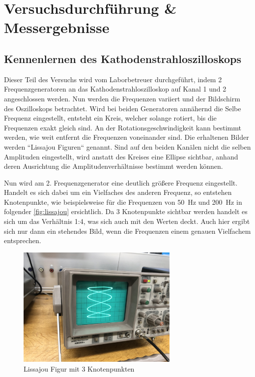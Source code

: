 \documentclass[11pt,ngerman]{scrartcl}
\begin{document}
\newpage

\section{Versuchsdurchführung \& Messergebnisse}\label{sec:Versuchsdurchführung}

\subsection{Kennenlernen des Kathodenstrahloszilloskops}

Dieser Teil des Versuchs wird vom Laborbetreuer durchgeführt, indem 2 Frequenzgeneratoren an das Kathodenstrahloszilloskop auf Kanal 1 und 2 angeschlossen werden. Nun werden die Frequenzen variiert und der Bildschirm des Oszilloskops betrachtet. Wird bei beiden Generatoren annähernd die Selbe Frequenz eingestellt, entsteht ein Kreis, welcher solange rotiert, bis die Frequenzen exakt gleich sind. An der Rotationsgeschwindigkeit kann bestimmt werden, wie weit entfernt die Frequenzen voneinander sind. Die erhaltenen Bilder werden ``Lissajou Figuren`` genannt.
Sind auf den beiden Kanälen nicht die selben Amplituden eingestellt, wird anstatt des Kreises eine Ellipse sichtbar, anhand deren Ausrichtung die Amplitudenverhältnisse bestimmt werden können.

\vspace{2mm}

Nun wird am 2. Frequenzgenerator eine deutlich größere Frequenz eingestellt. Handelt es sich dabei um ein Vielfaches des anderen Frequenz, so entstehen Knotenpunkte, wie beispielsweise für die Frequenzen von \SI{50}{\hertz} und \SI{200}{\hertz} in folgender \autoref{fig:lissajou} ersichtlich. Da 3 Knotenpunkte sichtbar werden handelt es sich um das Verhältnis 1:4, was sich auch mit den Werten deckt. Auch hier ergibt sich nur dann ein stehendes Bild, wenn die Frequenzen einem genauen Vielfachem entsprechen.

\begin{figure}[H]
	\begin{center}
		\includegraphics[width=0.7\textwidth]{figur}
	\end{center}
	\caption{Lissajou Figur mit 3 Knotenpunkten}
	\label{fig:lissajou}
\end{figure}
\end{document}
